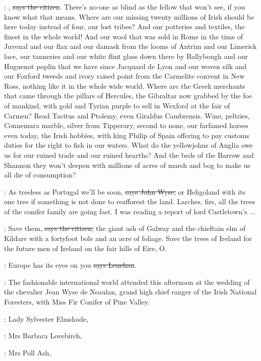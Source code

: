 \citizen:
, \sout{says the citizen}.
There's no-one as blind as the fellow that
won't see, if you know what that means.
Where are our missing
twenty millions of Irish should be here today instead of four,
our lost tribes? And our potteries and textiles, the finest in
the whole world! And our wool that was sold in Rome in the time
of Juvenal and our flax and our damask from the looms of Antrim
and our Limerick lace, our tanneries and our white flint glass
down there by Ballybough and our Huguenot poplin that we have since
Jacquard de Lyon and our woven silk and our Foxford tweeds and ivory
raised point from the Carmelite convent in New Ross, nothing like it in
the whole wide world. Where are the Greek merchants that came through the
pillars of Hercules, the Gibraltar now grabbed by the foe of mankind, with
gold and Tyrian purple to sell in Wexford at the fair of Carmen?
Read
Tacitus and Ptolemy, even Giraldus Cambrensis. Wine, peltries,
Connemara marble, silver from Tipperary, second to none, our farfamed
horses even today, the Irish hobbies, with king Philip of Spain offering
to pay customs duties for the right to fish in our waters. What do the
yellowjohns of Anglia owe us for our ruined trade and our ruined hearths?
And the beds of the Barrow and Shannon they won't deepen with millions
of acres of marsh and bog to make us all die of consumption?

\johnwyse:
As treeless as Portugal we'll be soon,
\sout{says John Wyse,} or Heligoland
with its one tree if something is not done to reafforest the land.
Larches, firs, all the trees of the conifer family are going fast.
I was
reading a report of lord Castletown's ...

\citizen:
Save them, \sout{says the citizen,}
the giant ash of Galway and the chieftain
elm of Kildare with a fortyfoot bole and an acre of foliage. Save the
trees of Ireland for the future men of Ireland on the fair hills of
Eire, O.

\lenehan:
Europe has its eyes on you \sout{says Lenehan}.

:
The fashionable international world attended
 this afternoon
at the wedding of the chevalier Jean Wyse de Neaulan, grand high chief
ranger of the Irish National Foresters,
with Miss Fir Conifer of Pine Valley.

:
Lady Sylvester Elmshade,

:
Mrs Barbara Lovebirch, 

:
Mrs Poll Ash, 

